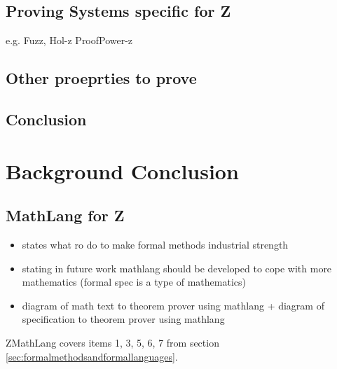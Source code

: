 \subsection{Proving Systems specific for Z}
\label{subsec:provingSystemsForZ}

e.g. Fuzz, Hol-z ProofPower-z

\subsection{Other proeprties to prove}
\label{subsec:propertiestoprove}

\subsection{Conclusion}

\section{Background Conclusion}

\subsection{MathLang for Z}

\begin{itemize}
\item \cite{fmpresetation} states what ro do to make formal methods industrial strength

\item \cite{lamarphd} stating in future work mathlang should be developed to cope with more mathematics (formal spec is a type of mathematics)

\item diagram of math text to theorem prover using mathlang + diagram of specification to theorem prover using mathlang
\end{itemize}

ZMathLang covers items 1, 3, 5, 6, 7 from section \ref{sec:formalmethodsandformallanguages}.